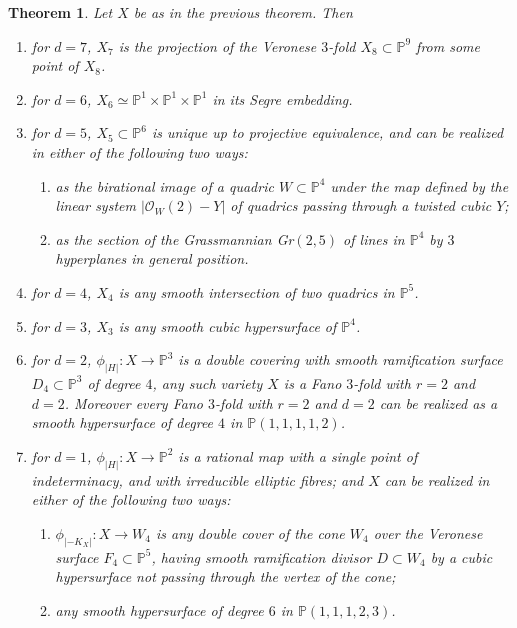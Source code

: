 \documentclass[11pt]{amsart}
\theoremstyle{plain}
\newtheorem{theorem}{Theorem}[section]
\theoremstyle{definition}
\theoremstyle{expl}
\begin{document}
\begin{theorem} Let $X$ be as in the previous theorem. Then 
\begin{enumerate}        
        \item[(i)] for $d=7$, $X_7$ is the projection of the Veronese $3$-fold $X_8 \subset \mathbb{P}^9$ from some point of $X_8$.
        \item[(ii)] for $d=6$, $X_6 \simeq \mathbb{P}^1 \times \mathbb{P}^1\times \mathbb{P}^1$ in its Segre embedding.
        \item[(iii)] for $d=5$, $X_5 \subset \mathbb{P}^6$ is unique up to projective equivalence, and can be realized in either of the following two ways:
        \begin{enumerate}
            \item[(a)] as the birational image of a quadric $W \subset \mathbb{P}^4$ under the map defined by the linear system $|\mathcal{O}_W(2)-Y|$ of quadrics passing through a twisted cubic $Y$;
            \item[(b)] as the section of the Grassmannian Gr$(2,5)$ of lines in $\mathbb{P}^4$ by $3$ hyperplanes in general position.
        \end{enumerate}
        \item[(iv)] for $d=4$, $X_4$ is any smooth intersection of two quadrics in $\mathbb{P}^5$.
        \item[(v)] for $d=3$, $X_3$ is any smooth cubic hypersurface of $\mathbb{P}^4$. 
        \item[(vi)] for $d=2$, $\phi_{|H|}: X \to \mathbb{P}^3$ is a double covering with smooth ramification surface $D_4 \subset \mathbb{P}^3$ of degree $4$, any such variety $X$ is a Fano $3$-fold with $r=2$ and $d=2$. Moreover every Fano $3$-fold with $r=2$ and $d=2$ can be realized as a smooth hypersurface of degree $4$ in $\mathbb{P}(1,1,1,1,2)$.
        \item[(vii)] for $d=1$, $\phi_{|H|}: X \to \mathbb{P}^2$ is a rational map with a single point of indeterminacy, and with irreducible elliptic fibres; and $X$ can be realized in either of the following two ways:
        \begin{enumerate}
            \item[(a)] $\phi_{|-K_X|}: X \to W_4$ is any double cover of the cone $W_4$ over the Veronese surface $F_4 \subset \mathbb{P}^5$, having smooth ramification divisor $D \subset W_4$ by a cubic hypersurface not passing through the vertex of the cone;
            \item[(b)] any smooth hypersurface of degree $6$ in $\mathbb{P}(1,1,1,2,3)$.
        \end{enumerate}
    \end{enumerate}
\end{theorem}
\end{document}

